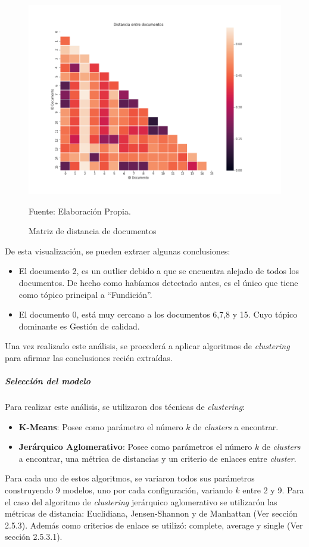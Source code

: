     \begin{figure}[H]
        \centering
        \includegraphics[width=1\textwidth]{figures/Clustering/distancia.png}
        \caption{\label{fig:DistanceMatrix} Matriz de distancia de documentos} Fuente: Elaboración Propia.
    \end{figure}
    
    De esta visualización, se pueden extraer algunas conclusiones:
    \begin{itemize}
        \item El documento 2, es un outlier debido a que se encuentra alejado de todos los documentos. De hecho como habíamos detectado antes, es el único que tiene como tópico principal a ``Fundición''. 
        \item El documento 0, está muy cercano a los documentos 6,7,8 y 15. Cuyo tópico dominante es Gestión de calidad.
    \end{itemize}
    Una vez realizado este análisis, se procederá a aplicar algoritmos de \textit{clustering} para afirmar las conclusiones recién extraídas.
    
    \newpage
    
\subparagraph{Selección del modelo}
\subparagraph*{}
    Para realizar este análisis, se utilizaron dos técnicas de \textit{clustering}: 
    \begin{itemize}
        \item \textbf{K-Means}: Posee como parámetro el número $k$ de \textit{clusters} a encontrar.
        \item \textbf{Jerárquico Aglomerativo}: Posee como parámetros el número $k$ de \textit{clusters} a encontrar, una métrica de distancias y un criterio de enlaces entre \textit{cluster}. 
    \end{itemize}
    Para cada uno de estos algoritmos, se variaron todos sus parámetros construyendo 9 modelos, uno por cada configuración, variando $k$ entre 2 y 9. Para el caso del algoritmo de \textit{clustering} jerárquico aglomerativo se utilizarón las métricas de distancia: Euclidiana, Jensen-Shannon y de Manhattan (Ver sección 2.5.3). Además como criterios de enlace se utilizó: complete, average y single (Ver sección 2.5.3.1). 
    
